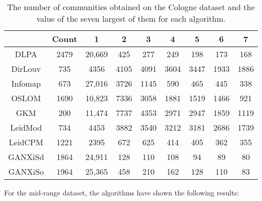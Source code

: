 \begin{table}[ht]%
	\centering
	\caption{The number of communities obtained on the Cologne dataset and the value of the seven largest of them for each algorithm.}%
	\label{tab:cologneCommunityNumber}%
		\begin{tabular}{ c  c  c  c  c  c  c  c  c }%
			\toprule
			& Count & 1 & 2 & 3 & 4 & 5 & 6 & 7\\
			\hline
			DLPA & 2479 & 20,669 & 425 & 277 & 249 & 198 & 173 & 168 \\
			DirLouv & 735 & 4356 & 4105 & 4091 & 3604 & 3447 & 1933 & 1886  \\
			Infomap & 673 & 27,016 & 3726 & 1145 & 590 & 465 & 445 & 338 \\
			OSLOM & 1690 & 10,823 & 7336 & 3058 & 1881 & 1519 & 1466 & 921 \\
			GKM & 200 & 11,474 & 7737 & 4353 & 2971 & 2947 & 1859 & 1119  \\
			LeidMod & 734 & 4453 & 3882 & 3540 & 3212 & 3181 & 2686 & 1739 \\
			LeidCPM & 1221 & 2395 & 672 & 625 & 414 & 405 & 362 & 355 \\
			GANXiSd & 1864 & 24,911 & 128 & 110 & 108 & 94 & 89 & 80 \\
			GANXiSo & 1964 & 25,365 & 458 & 210 & 162 & 128 & 110 & 83 \\
			\bottomrule
		\end{tabular}%
\end{table}

For the mid-range dataset, the algorithms have shown the following results:

